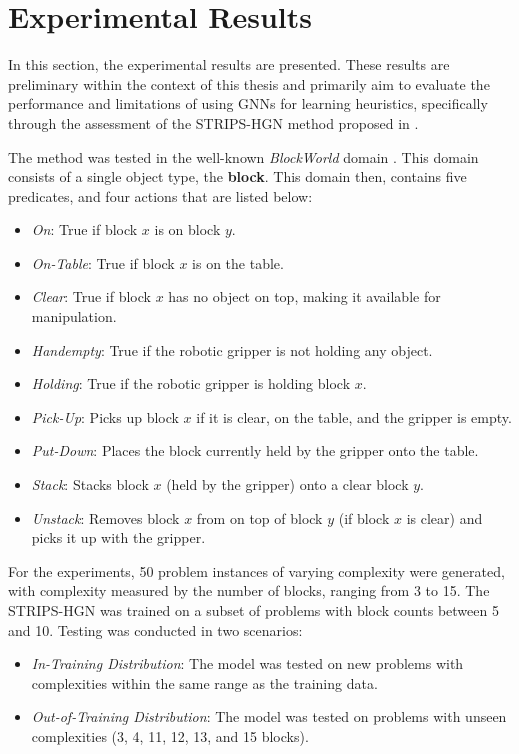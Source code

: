 \section{Experimental Results}
\label{sec:gnn_experimental_results}
In this section, the experimental results are presented. These results are preliminary within the context of this thesis and primarily aim to evaluate the performance and limitations of using GNNs for learning heuristics, specifically through the assessment of the STRIPS-HGN method proposed in \cite{shen2020learning}.

The method was tested in the well-known \textit{BlockWorld} domain \cite{slaney2001blocks}. This domain consists of a single object type, the \textbf{block}. 
This domain then, contains five predicates, and four actions that are listed below: 

\begin{itemize}
    \item \textit{On}: True if block $x$ is on block $y$.
    \item \textit{On-Table}: True if block $x$ is on the table.
    \item \textit{Clear}: True if block $x$ has no object on top, making it available for manipulation.
    \item \textit{Handempty}: True if the robotic gripper is not holding any object.
    \item \textit{Holding}: True if the robotic gripper is holding block $x$.

    \item \textit{Pick-Up}: Picks up block $x$ if it is clear, on the table, and the gripper is empty.
    \item \textit{Put-Down}: Places the block currently held by the gripper onto the table.
    \item \textit{Stack}: Stacks block $x$ (held by the gripper) onto a clear block $y$.
    \item \textit{Unstack}: Removes block $x$ from on top of block $y$ (if block $x$ is clear) and picks it up with the gripper.
\end{itemize}

For the experiments, 50 problem instances of varying complexity were generated, with complexity measured by the number of blocks, ranging from 3 to 15. The STRIPS-HGN was trained on a subset of problems with block counts between 5 and 10. Testing was conducted in two scenarios:

\begin{itemize}
    \item \textit{In-Training Distribution}: The model was tested on new problems with complexities within the same range as the training data.
    \item \textit{Out-of-Training Distribution}: The model was tested on problems with unseen complexities (3, 4, 11, 12, 13, and 15 blocks).
\end{itemize}

